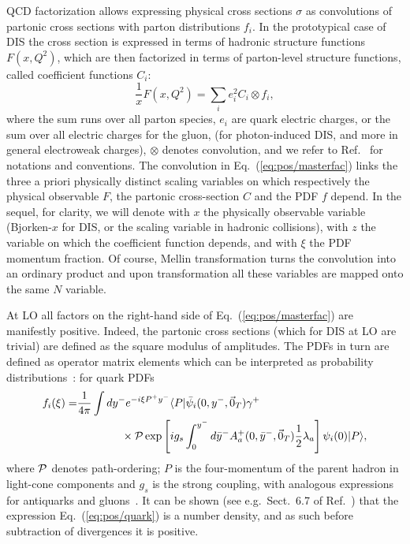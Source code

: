 
QCD factorization allows expressing physical cross sections $\sigma$  as
convolutions of partonic cross sections with parton distributions $f_i$. 
In the prototypical case of DIS the cross section is expressed in terms of
hadronic structure functions $F(x,Q^2)$, which are then factorized in terms of
parton-level structure functions, called coefficient functions $C_i$:
\begin{equation}
  \label{eq:pos/masterfac}
 \frac{1}{x} F(x,Q^2)=\sum_{i} e^2_i C_i \otimes f_i ,
\end{equation}
where the sum runs over all parton species, $e_i$ are quark electric charges,
or the sum over all electric charges for the gluon, (for photon-induced DIS,
and more in general electroweak charges), $\otimes$ denotes convolution, and we
refer to Ref.~\cite{Ellis:1991qj} for notations and conventions. 
The convolution in Eq.~(\ref{eq:pos/masterfac}) links the three a priori physically
distinct scaling variables on which respectively the physical observable $F$,
the partonic cross-section $C$ and the PDF $f$ depend.
In the sequel, for
clarity, we will denote with $x$ the physically observable variable
(Bjorken-$x$ for DIS, or the scaling variable in hadronic collisions), with $z$
the variable on which the coefficient function depends, and with $\xi$ the PDF
momentum fraction.
Of course, Mellin transformation turns the convolution into an ordinary product
and upon transformation all these variables are mapped onto the same $N$
variable. 
 
At LO all factors on the right-hand side of Eq.~(\ref{eq:pos/masterfac}) are
manifestly positive.
Indeed, the partonic cross sections (which for DIS at LO are trivial) are
defined as the square modulus of amplitudes. 
The PDFs in turn are defined as operator matrix elements which can be
interpreted as probability distributions~\cite{Collins:1981uw,Curci:1980uw}:
for quark PDFs~\cite{Collins:1981uw}  
\begin{align}
    \label{eq:pos/quark}
    f_i(\xi)=
    &\frac{1}{4\pi}\int dy^- e^{-i \xi P^+ y^-}
    \langle P| \bar \psi_i(0,y^-,\vec 0_T)\gamma^+
    \nonumber\\ 
    &\qquad\qquad
    \times{\cal P} \exp\left[ i g_s \int_0^{y^-} d
    \bar y^- A_a^+(0,\bar y^-,\vec 0_T)\frac{1}{2} \lambda_a\right] \psi_i(0) |P\rangle ,
\end{align}
where ${\cal P}$ denotes path-ordering; $P$ is the four-momentum of
the parent hadron in light-cone components and $g_s$ is the strong
coupling, with analogous expressions for antiquarks and
gluons~\cite{Collins:1981uw}.  It can be shown (see
e.g.\ Sect.~6.7 of Ref.~\cite{Collins:2011zzd}) that the expression
Eq.~(\ref{eq:pos/quark}) is a number density, and as such before
subtraction of divergences it is positive.

